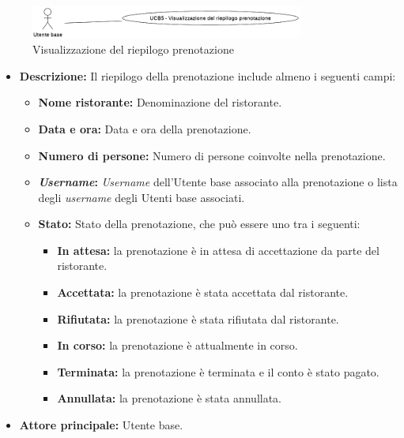 \newpage
{}
\label{usecase:Visualizzazione del riepilogo prenotazione}

\begin{figure}[h]
	\centering
	\includegraphics[width=0.8\textwidth]{./uml/UCB5.png} 
	\caption{Visualizzazione del riepilogo prenotazione}
	\label{fig:UCB5}
  \end{figure}

\begin{itemize}
	\item \textbf{Descrizione:}
	Il riepilogo della prenotazione include almeno i seguenti campi:
	\begin{itemize}
		\item \textbf{Nome ristorante:} Denominazione del ristorante.
		\item \textbf{Data e ora:} Data e ora della prenotazione.
		\item \textbf{Numero di persone:} Numero di persone coinvolte nella prenotazione.
		\item \textbf{\textit{Username}:} \textit{Username} dell'Utente base associato alla prenotazione o lista degli \textit{username} degli Utenti base associati.

		\item \textbf{Stato:} Stato della prenotazione, che può essere uno tra i seguenti:
			  \begin{itemize}
				  \item \textbf{In attesa:} la prenotazione è in attesa di accettazione da parte del ristorante.
				  \item \textbf{Accettata:} la prenotazione è stata accettata dal ristorante.
				  \item \textbf{Rifiutata:} la prenotazione è stata rifiutata dal ristorante.
				  \item \textbf{In corso:} la prenotazione è attualmente in corso.
				  \item \textbf{Terminata:} la prenotazione è terminata e il conto è stato pagato.
				  \item \textbf{Annullata:} la prenotazione è stata annullata.
			  \end{itemize}
	\end{itemize}
	
	\item \textbf{Attore principale:} Utente base.


\end{itemize}
